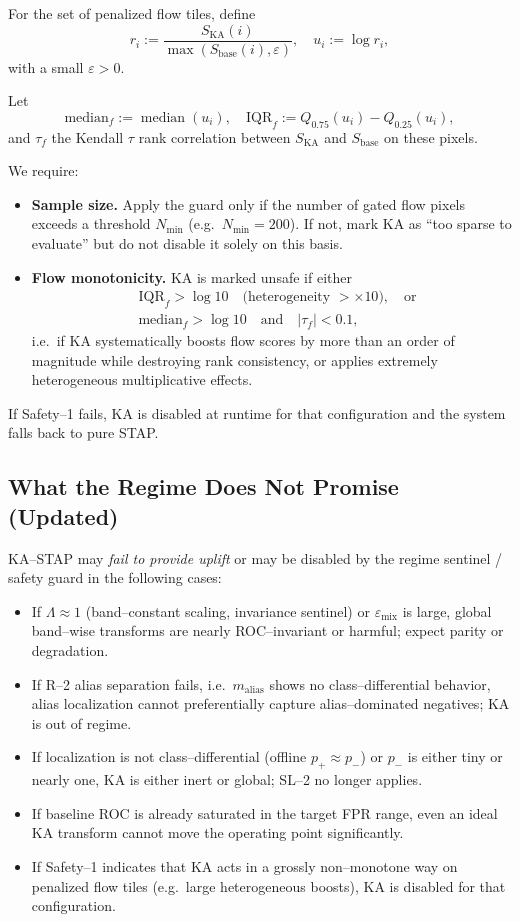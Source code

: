 For the set of penalized flow tiles, define
\[
r_i := \frac{S_{\text{KA}}(i)}{\max(S_{\text{base}}(i),\varepsilon)},\quad
u_i := \log r_i,
\]
with a small $\varepsilon>0$.

Let
\[
\mathrm{median}_f := \operatorname{median}(u_i),\quad
\mathrm{IQR}_f := Q_{0.75}(u_i) - Q_{0.25}(u_i),
\]
and $\tau_f$ the Kendall $\tau$ rank correlation between $S_{\text{KA}}$ and $S_{\text{base}}$ on these pixels.

We require:
\begin{itemize}[nosep]
  \item \textbf{Sample size.} Apply the guard only if the number of gated flow pixels exceeds a threshold $N_{\min}$ (e.g.\ $N_{\min}=200$). If not, mark KA as ``too sparse to evaluate'' but do not disable it solely on this basis.
  \item \textbf{Flow monotonicity.} KA is marked unsafe if either
  \begin{align*}
    &\mathrm{IQR}_f > \log 10\quad\text{(heterogeneity }>\times10\text{)},\quad\text{or}\\
    &\mathrm{median}_f > \log 10\quad\text{and}\quad |\tau_f| < 0.1,
  \end{align*}
  i.e.\ if KA systematically boosts flow scores by more than an order of magnitude while destroying rank consistency, or applies extremely heterogeneous multiplicative effects.
\end{itemize}

If Safety--1 fails, KA is disabled at runtime for that configuration and the system falls back to pure STAP.

\subsection{What the Regime Does Not Promise (Updated)}

KA--STAP may \emph{fail to provide uplift} or may be disabled by the regime sentinel / safety guard in the following cases:

\begin{itemize}[nosep]
  \item If $\Lambda\approx 1$ (band--constant scaling, invariance sentinel) or $\varepsilon_{\text{mix}}$ is large, global band--wise transforms are nearly ROC--invariant or harmful; expect parity or degradation.
  \item If R--2 alias separation fails, i.e.\ $m_{\text{alias}}$ shows no class--differential behavior, alias localization cannot preferentially capture alias--dominated negatives; KA is out of regime.
  \item If localization is not class--differential (offline $p_+\approx p_-$) or $p_-$ is either tiny or nearly one, KA is either inert or global; SL--2 no longer applies.
  \item If baseline ROC is already saturated in the target FPR range, even an ideal KA transform cannot move the operating point significantly.
  \item If Safety--1 indicates that KA acts in a grossly non--monotone way on penalized flow tiles (e.g.\ large heterogeneous boosts), KA is disabled for that configuration.
\end{itemize}

